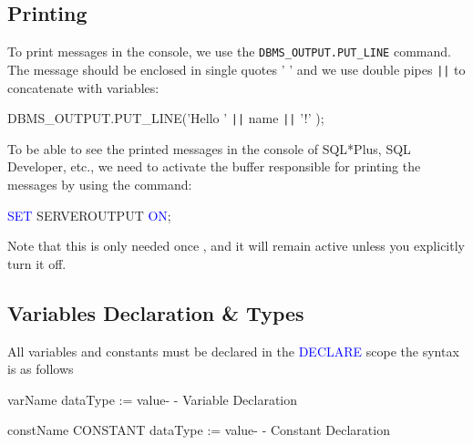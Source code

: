 \subsection{Printing}
\begin{tcolorbox}[title = DBMS\_OUTPUT.PUT\_LINE]
To print messages in the console, we use the \texttt{DBMS\_OUTPUT.PUT\_LINE} command. The message should be enclosed
in single quotes ' ' and we use double pipes \texttt{||} to concatenate with variables:

\begin{center}
DBMS\_OUTPUT.PUT\_LINE(\textcolor{messagegreen}{'Hello '} \texttt{||} name \texttt{||} \textcolor{messagegreen}{'!'} );
\end{center}
\end{tcolorbox}

\begin{tcolorbox}[title = Note]
To be able to see the printed messages in the console of SQL*Plus, SQL Developer, etc., we need to activate
the buffer responsible for printing the messages by using the command: 
\begin{center}
    \textcolor{blue}{SET} SERVEROUTPUT \textcolor{blue}{ON};
\end{center}
Note that this is only needed once , and it will remain active unless you explicitly turn it off.
\end{tcolorbox}
\subsection{Variables Declaration \& Types}
\begin{tcolorbox}[title = Variables \& Constants]
All variables and constants must be declared in the \textcolor{blue}{DECLARE} scope the syntax is as follows

\vspace{0.35cm}

\hspace{4cm}varName dataType := value\hspace{3.95cm}\textcolor{commentgray}{- - Variable Declaration}

\vspace {0.15cm}
\hspace{4cm}constName CONSTANT dataType := value\hspace{1.5cm}\textcolor{commentgray}{- - Constant Declaration}\\

\end{tcolorbox}

